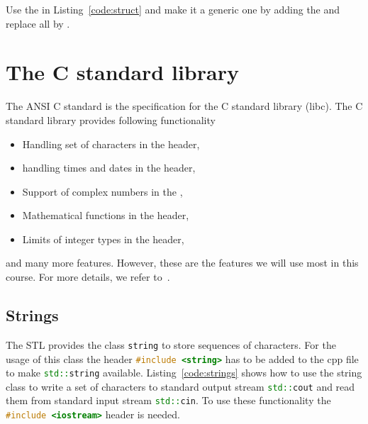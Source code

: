 \begin{exercise}
Use the  in Listing~\ref{code:struct} and make it a generic one by adding the  and replace all  by .
\end{exercise}

\newpage
\theendnotes

\chapter{The C standard library}
\label{chapter:cpp:lib}
The ANSI C standard is the specification for the C standard library (libc). The C standard library provides following functionality
\begin{itemize}
\item Handling set of characters in the  header,
\item handling times and dates in the  header,
\item Support of complex numbers in the ,
\item Mathematical functions in the  header,
\item Limits of integer types in the  header,
\end{itemize}
and many more features. However, these are the features we will use most in this course. For more details, we refer to~\cite{josuttis2012c++}.

\section{Strings}
The STL provides the class \lstinline[language=C++]{string} to store sequences of characters. For the usage of this class the header \lstinline[language=c++]{#include <string>} has to be added to the cpp file to make \lstinline[language=c++]{std::string} available. Listing~\ref{code:strings} shows how to use the string class to write a set of characters to standard output stream \lstinline[language=c++]{std::cout} and read them from standard input stream \lstinline[language=c++]{std::cin}. To use these functionality the \lstinline[language=c++]{#include <iostream>} header is needed.  \\

